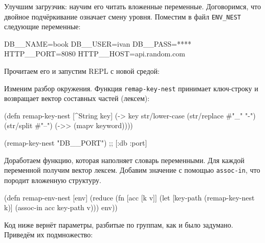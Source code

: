 Улучшим загрузчик: научим его читать вложенные переменные. Договоримся, что
двойное подчёркивание означает смену уровня. Поместим в файл \verb|ENV_NEST|
следующие переменные:

\begin{english}
  \begin{bash}
DB__NAME=book
DB__USER=ivan
DB__PASS=****
HTTP__PORT=8080
HTTP__HOST=api.random.com
  \end{bash}
\end{english}


\noindent
Прочитаем его и запустим REPL с новой средой:

\begin{english}
\end{english}

\mnoindent
Изменим разбор окружения. Функция \texttt{remap\--key\--nest} принимает ключ-строку и
возвращает вектор составных частей (лексем):

\begin{english}
  \begin{clojure}
(defn remap-key-nest
  [^String key]
  (-> key
      str/lower-case
      (str/replace #"_" "-")
      (str/split #"--")
      (->> (mapv keyword))))

(remap-key-nest "DB__PORT")
;; [:db :port]
  \end{clojure}
\end{english}


Доработаем функцию, которая наполняет словарь переменными. Для каждой переменной
получим вектор лексем. Добавим значение с помощью \verb|assoc-in|, что породит
вложенную структуру.

\begin{english}
  \begin{clojure}
(defn remap-env-nest
  [env]
  (reduce
   (fn [acc [k v]]
     (let [key-path (remap-key-nest k)]
       (assoc-in acc key-path v)))
   {}
   env))
  \end{clojure}
\end{english}

Код ниже вернёт параметры, разбитые по группам, как и было задумано. Приведём их
подмножество:

\ifx\DEVICETYPE\MOBILE

